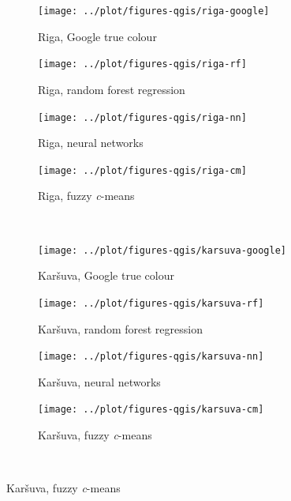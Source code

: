 \documentclass[a4paper,10pt]{book}
\begin{document}
\begin{figure}
  \ContinuedFloat
  \centering
  \begin{subfigure}[b]{.23\textwidth}
    \texttt{[image: ../plot/figures-qgis/riga-google]}
    \caption{Riga, Google true colour}
  \end{subfigure} \hfill
  \begin{subfigure}[b]{.23\textwidth}
    \texttt{[image: ../plot/figures-qgis/riga-rf]}
    \caption{Riga, random forest regression}
    \label{subfig-riga-rf}
  \end{subfigure} \hfill
  \begin{subfigure}[b]{.23\textwidth}
    \texttt{[image: ../plot/figures-qgis/riga-nn]}
    \caption{Riga, neural networks}
  \end{subfigure} \hfill
  \begin{subfigure}[b]{.23\textwidth}
    \texttt{[image: ../plot/figures-qgis/riga-cm]}
    \caption{Riga, fuzzy \textit{c}-means}
    \label{subfig-riga-cm}
  \end{subfigure} \
  \begin{subfigure}[b]{.23\textwidth}
    \texttt{[image: ../plot/figures-qgis/karsuva-google]}
    \caption{Kar\v{s}uva, Google true colour}
  \end{subfigure} \hfill
  \begin{subfigure}[b]{.23\textwidth}
    \texttt{[image: ../plot/figures-qgis/karsuva-rf]}
    \caption{Kar\v{s}uva, random forest regression}
    \label{subfig-karsuva-rf}
  \end{subfigure} \hfill
  \begin{subfigure}[b]{.23\textwidth}
    \texttt{[image: ../plot/figures-qgis/karsuva-nn]}
    \caption{Kar\v{s}uva, neural networks}
  \end{subfigure} \hfill
  \begin{subfigure}[b]{.23\textwidth}
    \texttt{[image: ../plot/figures-qgis/karsuva-cm]}
    \caption{Kar\v{s}uva, fuzzy \textit{c}-means}
    \label{subfig-karsuva-cm}
  \end{subfigure} \
\end{figure}
\end{document}

